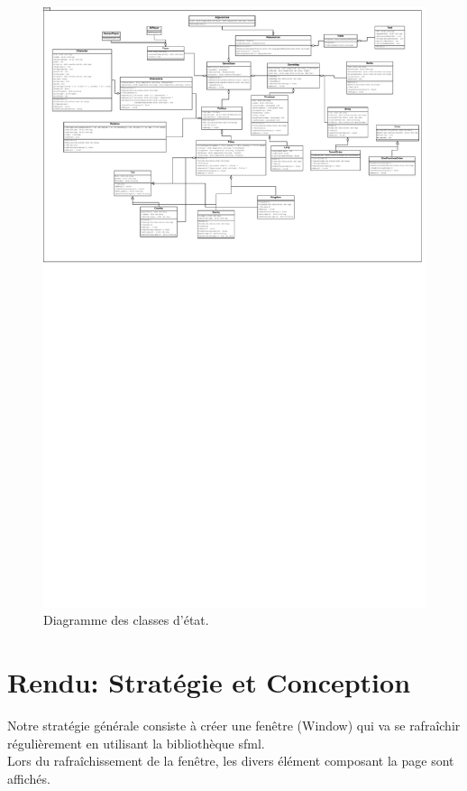 \documentclass[a4paper,12pt]{article}
\begin{document}
\begin{landscape}
\begin{figure}[p]
\includegraphics[width=0.9\paperheight]{state.pdf}
\caption{\label{uml:state}Diagramme des classes d'état.} 
\end{figure}
\end{landscape}

\clearpage
\section{Rendu: Stratégie et Conception}

Notre stratégie générale consiste à créer une fenêtre (Window) qui va se rafraîchir régulièrement en utilisant la bibliothèque sfml.\\
Lors du rafraîchissement de la fenêtre, les divers élément composant la page sont affichés.\\
\end{document}
